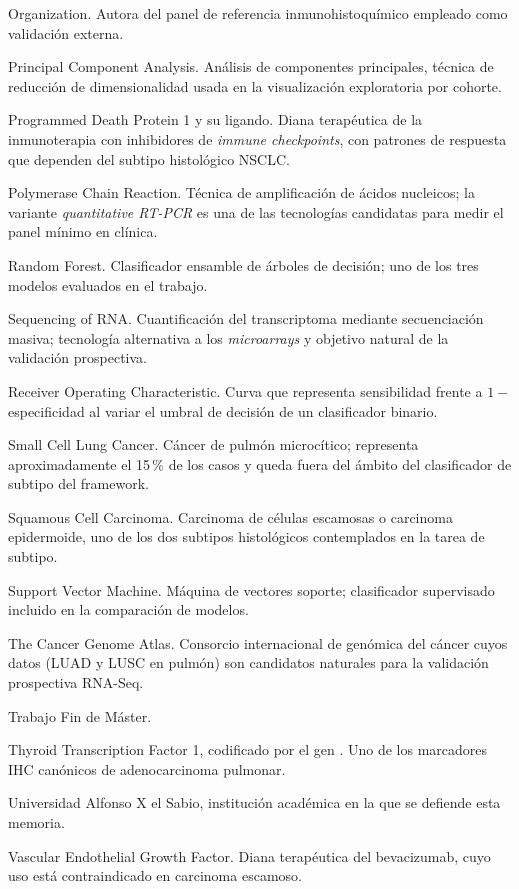 \begin{description}
  Organization. Autora del panel de referencia inmunohistoquímico
  empleado como validación externa.
  \item[PCA] Principal Component Analysis. Análisis de componentes
  principales, técnica de reducción de dimensionalidad usada en la
  visualización exploratoria por cohorte.
  \item[PD-1 / PD-L1] Programmed Death Protein 1 y su ligando. Diana
  terapéutica de la inmunoterapia con inhibidores de \emph{immune
  checkpoints}, con patrones de respuesta que dependen del subtipo
  histológico NSCLC.
  \item[PCR] Polymerase Chain Reaction. Técnica de amplificación de
  ácidos nucleicos; la variante \emph{quantitative RT-PCR} es una de
  las tecnologías candidatas para medir el panel mínimo en clínica.
  \item[RF] Random Forest. Clasificador ensamble de árboles de decisión;
  uno de los tres modelos evaluados en el trabajo.
  \item[RNA-Seq] Sequencing of RNA. Cuantificación del transcriptoma
  mediante secuenciación masiva; tecnología alternativa a los
  \emph{microarrays} y objetivo natural de la validación prospectiva.
  \item[ROC] Receiver Operating Characteristic. Curva que representa
  sensibilidad frente a $1{-}$especificidad al variar el umbral de
  decisión de un clasificador binario.
  \item[SCLC] Small Cell Lung Cancer. Cáncer de pulmón microcítico;
  representa aproximadamente el 15\,\% de los casos y queda fuera del
  ámbito del clasificador de subtipo del framework.
  \item[SQC] Squamous Cell Carcinoma. Carcinoma de células escamosas o
  carcinoma epidermoide, uno de los dos subtipos histológicos
  contemplados en la tarea de subtipo.
  \item[SVM] Support Vector Machine. Máquina de vectores soporte;
  clasificador supervisado incluido en la comparación de modelos.
  \item[TCGA] The Cancer Genome Atlas. Consorcio internacional de
  genómica del cáncer cuyos datos (LUAD y LUSC en pulmón) son
  candidatos naturales para la validación prospectiva RNA-Seq.
  \item[TFM] Trabajo Fin de Máster.
  \item[TTF-1] Thyroid Transcription Factor 1, codificado por el gen
  . Uno de los marcadores IHC canónicos de
  adenocarcinoma pulmonar.
  \item[UAX] Universidad Alfonso X el Sabio, institución académica en
  la que se defiende esta memoria.
  \item[VEGF] Vascular Endothelial Growth Factor. Diana terapéutica del
  bevacizumab, cuyo uso está contraindicado en carcinoma escamoso.
\end{description}

